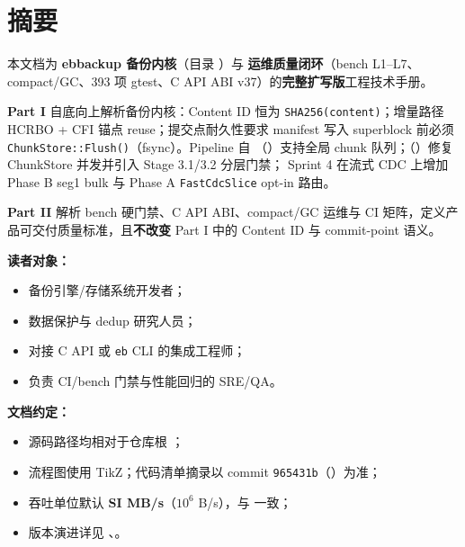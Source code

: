 \chapter*{摘要}

本文档为 \textbf{ebbackup 备份内核}（目录 ）与 \textbf{运维质量闭环}（bench L1--L7、compact/GC、393 项 gtest、C API ABI v37）的\textbf{完整扩写版}工程技术手册。

\textbf{Part I} 自底向上解析备份内核：Content ID 恒为 \texttt{SHA256(content)}；增量路径 HCRBO + CFI 锚点 reuse；提交点耐久性要求 manifest 写入 superblock 前必须 \texttt{ChunkStore::Flush()}（fsync）。Pipeline 自 （）支持全局 chunk 队列；（）修复 ChunkStore 并发并引入 Stage 3.1/3.2 分层门禁； Sprint 4 在流式 CDC 上增加 Phase B seg1 bulk 与 Phase A \texttt{FastCdcSlice} opt-in 路由。

\textbf{Part II} 解析 bench 硬门禁、C API ABI、compact/GC 运维与 CI 矩阵，定义产品可交付质量标准，且\textbf{不改变} Part I 中的 Content ID 与 commit-point 语义。

\vspace{1em}
\noindent\textbf{读者对象：}
\begin{itemize}[nosep]
  \item 备份引擎/存储系统开发者；
  \item 数据保护与 dedup 研究人员；
  \item 对接  C API 或 \texttt{eb} CLI 的集成工程师；
  \item 负责 CI/bench 门禁与性能回归的 SRE/QA。
\end{itemize}

\vspace{1em}
\noindent\textbf{文档约定：}
\begin{itemize}[nosep]
  \item 源码路径均相对于仓库根 ；
  \item 流程图使用 TikZ；代码清单摘录以 commit \texttt{965431b}（）为准；
  \item 吞吐单位默认 \textbf{SI MB/s}（$10^6$ B/s），与  一致；
  \item 版本演进详见 、。
\end{itemize}

